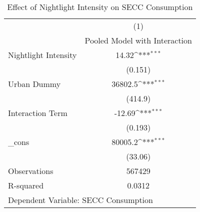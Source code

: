 \begin{table}[htbp]\centering
\def\sym#1{\ifmmode^{#1}\else\(^{#1}\)\fi}
\caption{Effect of Nightlight Intensity on SECC Consumption}
\begin{tabular}{l*{1}{c}}
\toprule
                    &\multicolumn{1}{c}{(1)}\\
                    &\multicolumn{1}{c}{Pooled Model with Interaction}\\
\midrule
Nightlight Intensity&       14.32\sym{***}\\
                    &     (0.151)         \\
Urban Dummy         &     36802.5\sym{***}\\
                    &     (414.9)         \\
Interaction Term    &      -12.69\sym{***}\\
                    &     (0.193)         \\
\_cons              &     80005.2\sym{***}\\
                    &     (33.06)         \\
\midrule
Observations        &      567429         \\
R-squared           &      0.0312         \\
\bottomrule
\multicolumn{2}{l}{\footnotesize Dependent Variable: SECC Consumption}\\
\end{tabular}
\end{table}
